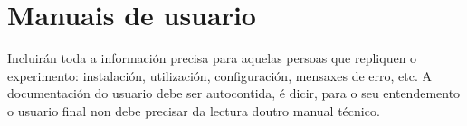 \chapter{Manuais de usuario}

Incluirán toda a información precisa para aquelas persoas que repliquen o experimento: instalación, utilización, configuración, mensaxes de erro, etc. A documentación do usuario debe ser autocontida, é dicir, para o seu entendemento o usuario final non debe precisar da lectura doutro manual técnico.
